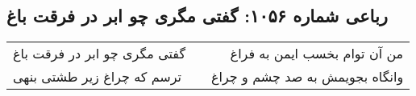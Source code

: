 \begin{center}
\section*{رباعی شماره ۱۰۵۶: گفتی مگری چو ابر در فرقت باغ}
\label{sec:1056}
\begin{longtable}{l p{0.5cm} r}
گفتی مگری چو ابر در فرقت باغ
&&
من آن توام بخسب ایمن به فراغ
\\
ترسم که چراغ زیر طشتی بنهی
&&
وانگاه بجویمش به صد چشم و چراغ
\\
\end{longtable}
\end{center}
